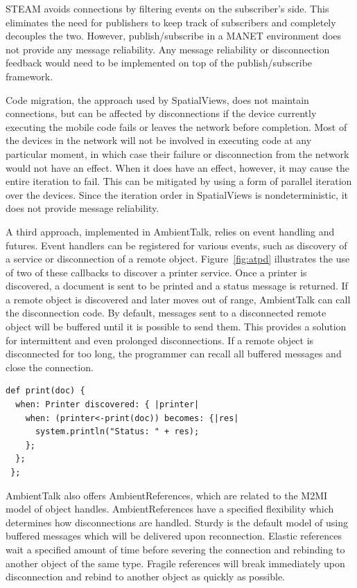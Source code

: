 STEAM avoids connections by filtering events on the subscriber's side. This eliminates the need for publishers to keep track of subscribers and completely decouples the two. However, publish/subscribe in a MANET environment does not provide any message reliability. Any message reliability or disconnection feedback would need to be implemented on top of the publish/subscribe framework.

Code migration, the approach used by SpatialViews, does not maintain connections, but can be affected by disconnections if the device currently executing the mobile code fails or leaves the network before completion.  Most of the devices in the network will not be involved in executing code at any particular moment, in which case their failure or disconnection from the network would not have an effect. When it does have an effect, however, it may cause the entire iteration to fail. This can be mitigated by using a form of parallel iteration over the devices. Since the iteration order in SpatialViews is nondeterministic, it does not provide message reliability.

A third approach, implemented in AmbientTalk, relies on event handling and futures. Event handlers can be registered for various events, such as discovery of a service or disconnection of a remote object. Figure~\ref{fig:atpd} illustrates the use of two of these callbacks to discover a printer service. Once a printer is discovered, a document is sent to be printed and a status message is returned.  If a remote object is discovered and later moves out of range, AmbientTalk can call the disconnection code. By default, messages sent to a disconnected remote object will be buffered until it is possible to send them. This provides a solution for intermittent and even prolonged disconnections. If a remote object is disconnected for too long, the programmer can recall all buffered messages and close the connection.

\begin{lstlisting}[caption={Printer Discovery in AmbientTalk}, label={fig:atpd}]
 def print(doc) {
  when: Printer discovered: { |printer|
    when: (printer<-print(doc)) becomes: {|res|
      system.println("Status: " + res);
    };
  };
 };
\end{lstlisting}

AmbientTalk also offers AmbientReferences\cite{ambientrefs}, which are related to the M2MI model of object handles.  AmbientReferences have a specified flexibility which determines how disconnections are handled. Sturdy is the default model of using buffered messages which will be delivered upon reconnection. Elastic references wait a specified amount of time before severing the connection and rebinding to another object of the same type. Fragile references will break immediately upon disconnection and rebind to another object as quickly as possible.

